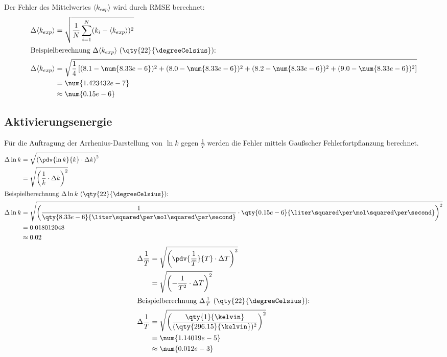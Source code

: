 Der Fehler des Mittelwertes $\langle k_{exp} \rangle$ wird durch RMSE berechnet:
\begin{align*}
    \Delta \langle k_{exp} \rangle &= \sqrt{\frac{1}{N} \sum_{i=1}^{N} (k_i - \langle k_{exp}\rangle)^2} \\
    \intertext{Beispielberechnung $\Delta \langle k_{exp} \rangle$ (\qty{22}{\degreeCelsius}):}
    \Delta \langle k_{exp} \rangle &= \sqrt{\frac{1}{4} \left[ (8.1 - \num{8.33e-6})^2 + (8.0 - \num{8.33e-6})^2 + (8.2 - \num{8.33e-6})^2 + (9.0- \num{8.33e-6})^2 \right]} \\
                                  &= \num{1.423432e-7} \\
                                 &\approx \num{0.15e-6}
\end{align*}

\subsection{Aktivierungsenergie}
Für die Auftragung der Arrhenius-Darstellung von $\ln k$ gegen $\frac{1}{T}$ werden die Fehler mittels Gaußscher Fehlerfortpflanzung berechnet.
\begin{align*}
    \Delta \ln k &= \sqrt{\left( \pdv{\ln k}{k} \cdot \Delta k \right)^2} \\
                 &= \sqrt{\left( \frac{1}{k} \cdot \Delta k \right)^2} \\
    \intertext{Beispielberechnung $\Delta \ln k$ (\qty{22}{\degreeCelsius}):}
    \Delta \ln k &= \sqrt{\left( \frac{1}{\qty{8.33e-6}{\liter\squared\per\mol\squared\per\second}} \cdot \qty{0.15e-6}{\liter\squared\per\mol\squared\per\second} \right)^2} \\
                 &= 0.018012048 \\
                &\approx 0.02
\end{align*}
\begin{align*}
    \Delta \frac{1}{T} &= \sqrt{\left( \pdv{\frac{1}{T}}{T} \cdot \Delta T \right)^2} \\
                      &= \sqrt{\left( -\frac{1}{T^2} \cdot \Delta T \right)^2} \\
    \intertext{Beispielberechnung $\Delta \frac{1}{T}$ (\qty{22}{\degreeCelsius}):}
    \Delta \frac{1}{T} &= \sqrt{\left( \frac{\qty{1}{\kelvin}}{(\qty{296.15}{\kelvin})^2}  \right)^2} \\
                     &= \num{1.14019e-5} \\
                    &\approx \num{0.012e-3}
\end{align*}

